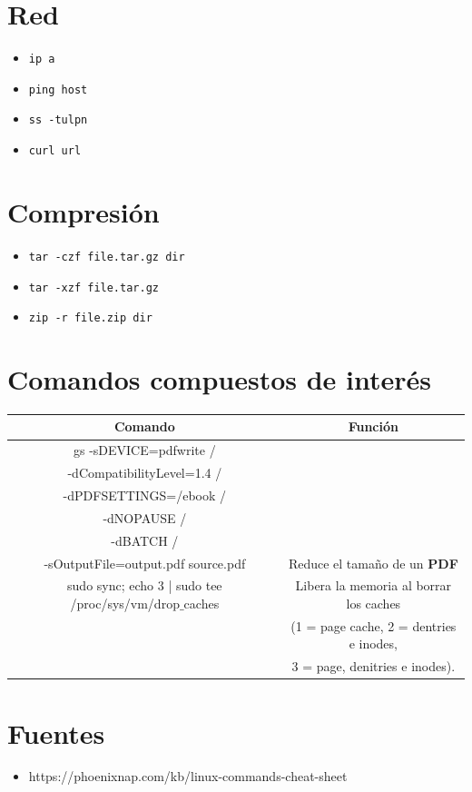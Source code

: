 \documentclass[a4paper,10pt]{article}
\begin{document}
\section*{Red}
\begin{itemize}[leftmargin=*]
    \item \texttt{ip a}
    \item \texttt{ping host}
    \item \texttt{ss -tulpn}
    \item \texttt{curl url}
\end{itemize}

\section*{Compresión}
\begin{itemize}[leftmargin=*]
    \item \texttt{tar -czf file.tar.gz dir}
    \item \texttt{tar -xzf file.tar.gz}
    \item \texttt{zip -r file.zip dir}
\end{itemize}


\section*{Comandos compuestos de interés}
\begin{center}
    \begin{tabular}{| c | c |}
        \hline
        Comando & Función \\
        \hline\hline
        gs -sDEVICE=pdfwrite  / \\ -dCompatibilityLevel=1.4  / \\ -dPDFSETTINGS=/ebook  / \\ -dNOPAUSE   / \\-dBATCH  / \\ -sOutputFile=output.pdf source.pdf & Reduce el tamaño de un \textbf{PDF}\\
        \hline
        sudo sync; echo 3 | sudo tee /proc/sys/vm/drop$\_$caches & Libera la memoria al borrar los caches \\  &  (1 = page cache, 2 = dentries e inodes, \\ & 3 = page, denitries e inodes). \\
        \hline
    \end{tabular}
\end{center}

\section*{Fuentes}
\begin{itemize}
    \item https://phoenixnap.com/kb/linux-commands-cheat-sheet
\end{itemize}
\end{document}

